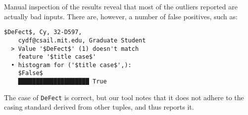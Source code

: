 Manual inspection of the results reveal that most of the outliers reported are actually bad inputs. There are, however, a number of false positives, such as:

\begin{lstlisting}[gobble=2]
  $DeFect$, Cy, 32-D597,
    cydf@csail.mit.edu, Graduate Student
  > Value '$DeFect$' (1) doesn't match
    feature '$title case$'
  • histogram for ('$title case$',):
    $False$
    ████████████████████ True
\end{lstlisting}

The case of \lstinline{DeFect} is correct, but our tool notes that it does not adhere to the casing standard derived from other tuples, and thus reports it.
